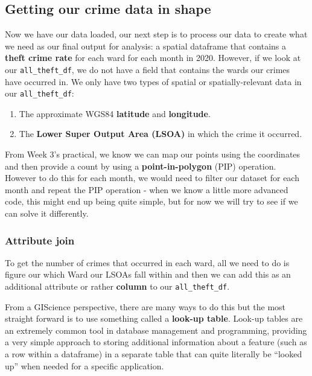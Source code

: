 \documentclass[
]{book}
\providecommand{\tightlist}{%
  \setlength{\itemsep}{0pt}\setlength{\parskip}{0pt}}
\begin{document}
\hypertarget{getting-our-crime-data-in-shape}{%
\subsection{Getting our crime data in shape}\label{getting-our-crime-data-in-shape}}

Now we have our data loaded, our next step is to process our data to create what we need as our final output for analysis: a spatial dataframe that contains a \textbf{theft crime rate} for each ward for each month in 2020. However, if we look at our \texttt{all\_theft\_df}, we do not have a field that contains the wards our crimes have occurred in. We only have two types of spatial or spatially-relevant data in our \texttt{all\_theft\_df}:

\begin{enumerate}
\def\labelenumi{\arabic{enumi})}
\tightlist
\item
  The approximate WGS84 \textbf{latitude} and \textbf{longitude}.
\item
  The \textbf{Lower Super Output Area (LSOA)} in which the crime it occurred.
\end{enumerate}

From Week 3's practical, we know we can map our points using the coordinates and then provide a count by using a \textbf{point-in-polygon} (PIP) operation. However to do this for each month, we would need to filter our dataset for each month and repeat the PIP operation - when we know a little more advanced code, this might end up being quite simple, but for now we will try to see if we can solve it differently.

\hypertarget{attribute-join}{%
\subsubsection{Attribute join}\label{attribute-join}}

To get the number of crimes that occurred in each ward, all we need to do is figure our which Ward our LSOAs fall within and then we can add this as an additional attribute or rather \textbf{column} to our \texttt{all\_theft\_df}.

From a GIScience perspective, there are many ways to do this but the most straight forward is to use something called a \textbf{look-up table}. Look-up tables are an extremely common tool in database management and programming, providing a very simple approach to storing additional information about a feature (such as a row within a dataframe) in a separate table that can quite literally be ``looked up'' when needed for a specific application.
\end{document}
